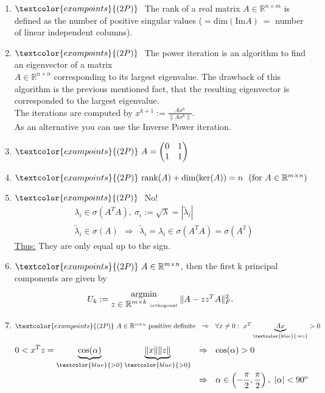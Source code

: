 \begin{enumerate}
	\item 
	$\textcolor{exampoints}{(2P)}~$ The rank of a real matrix $A\in\mathbb{R}^{n\times m}$ is defined as the number of positive singular values ($=\text{dim}(\text{Im}A)~=$ number of linear independent columns).
	
	\item 
	$\textcolor{exampoints}{(2P)}~$ The power iteration is an algorithm to find an eigenvector of a matrix\\ $A\in\mathbb{R}^{n\times n}$ corresponding to its largest eigenvalue. 
	The drawback of this algorithm is the previous mentioned fact, that the resulting eigenvector is corresponded to the largest eigenvalue.\\
	The iterations are computed by $x^{k+1}:=\frac{Ax^k}{\|Ax^k\|}$.\\
	As an alternative you can use the Inverse Power iteration.
	
	\item 
	$\textcolor{exampoints}{(2P)}~A=\begin{pmatrix}0&1\\1&1\end{pmatrix}$
	
	\item $\textcolor{exampoints}{(2P)}~\text{rank}(A)+\text{dim}(\text{ker}(A))=n~~(\text{for}~A\in\mathbb{R}^{m\times n})$
	
	\item 
	$\textcolor{exampoints}{(2P)}~$ No!
	\begin{align*}
	&\lambda_i\in\sigma(A^TA),~\sigma_i:=\sqrt{\lambda}=|\tilde{\lambda}_i|\\
	&\tilde{\lambda}_i\in\sigma(A)~~\Rightarrow~~\tilde{\lambda}_i=\lambda_i\in\sigma(A^TA)=\sigma(A^2)
	\end{align*}
	\underline{Thus:} They are only equal up to the sign.
	
	\item 
	$\textcolor{exampoints}{(2P)}~A\in\mathbb{R}^{m\times n}$, then the first k principal components are given by
	$$
	U_k:=\begin{matrix}\text{argmin}\\
	{z\in\mathbb{R}^{m\times k}~\text{\tiny{orthogonal}}}\end{matrix}~\|A-zz^TA\|_{F}^2.
	$$
	
	\item 
	$\textcolor{exampoints}{(2P)}~A\in\mathbb{R}^{n\times n}~ \text{positive definite}~~\Rightarrow~~\forall x\neq 0:~x^T\underbrace{Ax}_{\textcolor{blue}{:=z}}>0$ 
	\begin{align*} 
	0<x^Tz =\underbrace{\text{cos}(\alpha)}_{\textcolor{blue}{>0}}\underbrace{\|x\|\|z\|}_{\textcolor{blue}{>0}}~~&\Rightarrow~~\text{cos}(\alpha)>0\\
	&\Rightarrow~~\alpha\in\left(-\frac{\pi}{2},\frac{\pi}{2}\right),~|\alpha|<90^\text{o}
	\end{align*}
\end{enumerate}